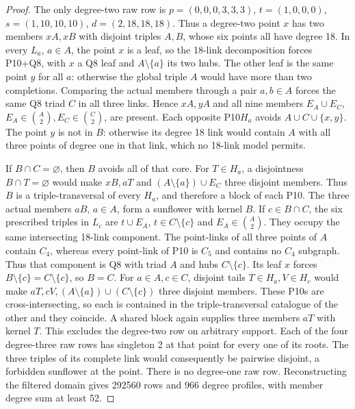 \documentclass[11pt,a4paper]{article}
\numberwithin{equation}{section}
\theoremstyle{remark}
\begin{document}
\begin{proof}
The only degree-two raw row is
$ p=(0,0,0,3,3,3)$, $ t=(1,0,0,0)$,
$ s=(1,10,10,10)$, $ d=(2,18,18,18)$.
Thus a degree-two point $ x $ has two members $ xA,xB $ with disjoint triples
$ A,B $, whose six points all have degree 18. In every $ L_a $, $ a\in A $,
the point $ x $ is a leaf, so the 18-link decomposition forces P10+Q8,
with $ x $ a Q8 leaf and $ A\setminus\{a\}$ its two hubs. The other leaf
is the same point $ y $ for all $ a $: otherwise the global triple $ A $
would have more than two completions. Comparing the actual members
through a pair $ a,b\in A $ forces the same Q8 triad $ C $ in all three
links. Hence $ xA,yA $ and all nine members
$ E_A\cup E_C $, $ E_A\in\binom A2,E_C\in\binom C2$, are present.
Each opposite P10$ H_a $ avoids $ A\cup C\cup\{x,y\}$.
The point $ y $ is not in $ B $: otherwise its degree 18 link would contain
$ A $ with all three points of degree one in that link, which no 18-link
model permits.

If $ B\cap C=\varnothing $, then $ B $ avoids all of that core. For
$ T\in H_a $, a disjointness $ B\cap T=\varnothing $ would make $ xB,aT $
and $(A\setminus\{a\})\cup E_C $ three disjoint members. Thus $ B $
is a triple-transversal of every $ H_a $, and therefore a block of each
P10. The three actual members $ aB $, $ a\in A $, form a sunflower with
kernel $ B $.
If $ c\in B\cap C $, the six prescribed triples in $ L_c $ are
$ t\cup E_A $, $ t\in C\setminus\{c\}$ and $ E_A\in\binom A2$.
They occupy the same intersecting 18-link component. The point-links
of all three points of $ A $ contain $ C_4$, whereas every point-link of
P10 is $ C_5$ and contains no $ C_4$ subgraph. Thus that component is
Q8 with triad $ A $ and hubs $ C\setminus\{c\}$. Its leaf $ x $ forces
$ B\setminus\{c\}=C\setminus\{c\}$, so $ B=C $.
For $ a\in A,c\in C $, disjoint tails $ T\in H_a,V\in H_c $ would make
$ aT,cV,(A\setminus\{a\})\cup(C\setminus\{c\})$ three disjoint
members. These P10s are cross-intersecting, so each is contained in
the triple-transversal catalogue of the other and they coincide.
A shared block again supplies three members $ aT $ with kernel $ T $.
This excludes the degree-two row on arbitrary support.
Each of the four degree-three raw rows has singleton 2 at that point
for every one of its roots. The three triples of its complete link
would consequently be pairwise disjoint, a forbidden sunflower at
the point. There is no degree-one raw row. Reconstructing the filtered
domain gives 292560 rows and 966 degree profiles, with member degree
sum at least 52.


\end{proof}
\end{document}
